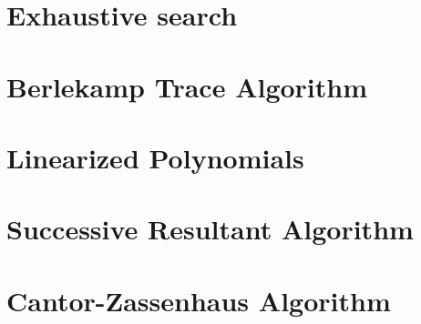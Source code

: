 \section{Exhaustive search}
\section{Berlekamp Trace Algorithm}
\section{Linearized Polynomials}
\section{Successive Resultant Algorithm}
\section{Cantor-Zassenhaus Algorithm}
